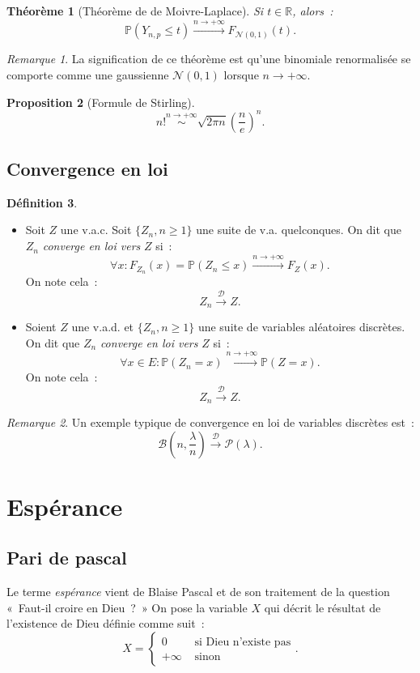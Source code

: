 \documentclass{article}
\renewcommand{\P}{\mathbb P}
\newcommand{\R}{\mathbb R}
\newcommand{\Nzu}{\mathcal N(0, 1)}  %
\newcommand{\convl}{\stackrel{\mathcal D}\to}  %
\newtheorem{thm}{Théorème}[section]
\newtheorem{prp}[thm]{Proposition}
\theoremstyle{definition}
\newtheorem{déf}[thm]{Définition}
\theoremstyle{remark}
\newtheorem*{rmq}{Remarque}
\begin{document}
		\begin{thm}[Théorème de de Moivre-Laplace] Si $t \in \R$, alors~:
		\[\P(Y_{n, p} \leq t) \stackrel{n \to +\infty}{\to}F_{\Nzu}(t).\]
		\end{thm}

		\begin{rmq} La signification de ce théorème est qu'une binomiale renormalisée se comporte comme une gaussienne $\Nzu$ lorsque $n \to +\infty$. \end{rmq}

		\begin{prp}[Formule de Stirling] \[n! \stackrel{n \to +\infty}\sim \sqrt{2\pi n}\left(\frac ne\right)^n.\] \end{prp}

	\subsection{Convergence en loi}
		\begin{déf}~
		\begin{itemize}
			\item Soit $Z$ une v.a.c. Soit $\{Z_n, n \geq 1\}$ une suite de v.a. quelconques. On dit que $Z_n$ \emph{converge en loi vers} $Z$ si~:
			      \[\forall x : F_{Z_n}(x) = \P(Z_n \leq x) \stackrel{n \to +\infty}\to F_Z(x).\]
			      On note cela~:
			      \[Z_n \convl Z.\]

			\item Soient $Z$ une v.a.d. et $\{Z_n, n \geq 1\}$ une suite de variables aléatoires discrètes. On dit que $Z_n$ \emph{converge en loi vers}
			      $Z$ si~:
			      \[\forall x \in E : \P(Z_n = x) \stackrel{n \to +\infty}\to \P(Z = x).\]
			      On note cela~:
				  \[Z_n \convl Z.\]
		\end{itemize}
		\end{déf}

		\begin{rmq} Un exemple typique de convergence en loi de variables discrètes est~:
		\[\mathcal B\left(n, \frac \lambda{n}\right) \convl \mathcal P(\lambda).\]
		\end{rmq}

\newpage
\section{Espérance}
	\subsection{Pari de pascal}
		Le terme \emph{espérance} vient de Blaise Pascal et de son traitement de la question «~Faut-il croire en Dieu~?~» On pose la variable $X$ qui
		décrit le résultat de l'existence de Dieu définie comme suit~:
		\[X = \begin{cases}0 &\text{ si Dieu n'existe pas} \\+\infty &\text{ sinon}\end{cases}.\]
\end{document}
